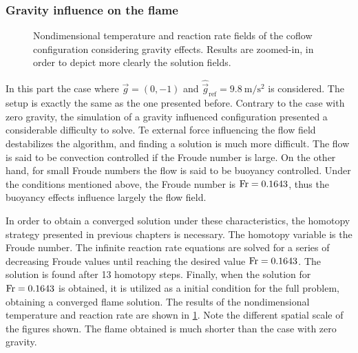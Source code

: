 \subsubsection{Gravity influence on the flame}
\begin{figure}[tbh!]
	\centering
	\pgfplotsset{width=0.35\textwidth, compat=1.3}
	\caption[Nondimensional temperature and reaction rate fields of the coflow configuration considering gravity effects.]{Nondimensional temperature and reaction rate fields of the coflow configuration considering gravity effects. Results are zoomed-in, in order to depict more clearly the solution fields.} \label{fig:CoFlowFlameFigWithGravity}
\end{figure}
In this part the case where $\vec{g} = (0, -1)$ and $\hat{\vec{g}}_{\text{ref}} = \SI{9.8}{\meter\per\square\second }$ is considered. The setup is exactly the same as the one presented before. Contrary to the case with zero gravity, the simulation of a gravity influenced configuration presented a considerable difficulty to solve. Te external force influencing the flow field destabilizes the algorithm, and finding a solution is much more difficult. The flow is said to be convection controlled if the Froude number is large. On the other hand, for small Froude numbers the flow is said to be buoyancy controlled. Under the conditions mentioned above, the Froude number is $\text{Fr} = 0.1643$, thus the buoyancy effects influence largely the flow field.

In order to obtain a converged solution under these characteristics, the homotopy strategy presented in previous chapters is necessary. The homotopy variable is the Froude number. The infinite reaction rate equations are solved for a series of decreasing Froude values until reaching the desired value $\text{Fr} = 0.1643$. The solution is found after 13 homotopy steps. Finally, when the solution for $\text{Fr} = 0.1643$ is obtained, it is utilized as a initial condition for the full problem, obtaining a converged flame solution. The results of the nondimensional temperature and reaction rate are shown in \cref{fig:CoFlowFlameFigWithGravity}. Note the different spatial scale of the figures shown. The flame obtained is much shorter than the case with zero gravity.